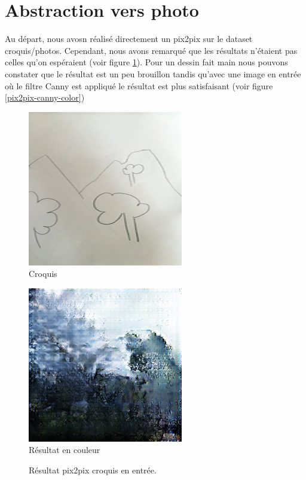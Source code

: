 \documentclass[a4paper, 12pt]{report}
\begin{document}
\section{Abstraction vers photo}
Au départ, nous avosn réalisé directement un pix2pix sur le dataset croquis/photos. Cependant, nous avons remarqué que les résultats n'étaient pas celles qu'on espéraient (voir figure \ref{pix2pix-color}). Pour un dessin fait main nous pouvons constater que le résultat est un peu brouillon tandis qu'avec une image en entrée où le filtre Canny est appliqué le résultat est plus satisfaisant (voir figure \ref{pix2pix-canny-color})

\begin{figure}[!h]
\centering 
\begin{minipage}{0.45\textwidth}
\centering
\includegraphics[scale=0.5]{images/croquis_2_real_A.png}
\\Croquis
\\
\end{minipage}
\begin{minipage}{0.45\textwidth}
\centering
\includegraphics[scale=0.5]{images/croquis_2_fake_B.png}
\\Résultat en couleur
\end{minipage}
\caption{\centering Résultat pix2pix croquis en entrée.}
\label{pix2pix-color}
\end{figure}
\end{document}
